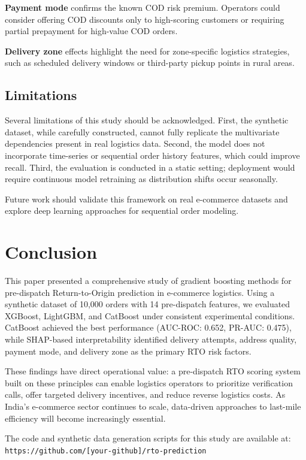 \documentclass[conference]{IEEEtran}
\begin{document}
\textbf{Payment mode} confirms the known COD risk premium. Operators could consider offering COD discounts only to high-scoring customers or requiring partial prepayment for high-value COD orders.

\textbf{Delivery zone} effects highlight the need for zone-specific logistics strategies, such as scheduled delivery windows or third-party pickup points in rural areas.

\subsection{Limitations}

Several limitations of this study should be acknowledged. First, the synthetic dataset, while carefully constructed, cannot fully replicate the multivariate dependencies present in real logistics data. Second, the model does not incorporate time-series or sequential order history features, which could improve recall. Third, the evaluation is conducted in a static setting; deployment would require continuous model retraining as distribution shifts occur seasonally.

Future work should validate this framework on real e-commerce datasets and explore deep learning approaches \cite{vaswani2017} for sequential order modeling.

\section{Conclusion}
\label{sec:conclusion}

This paper presented a comprehensive study of gradient boosting methods for pre-dispatch Return-to-Origin prediction in e-commerce logistics. Using a synthetic dataset of 10,000 orders with 14 pre-dispatch features, we evaluated XGBoost, LightGBM, and CatBoost under consistent experimental conditions. CatBoost achieved the best performance (AUC-ROC: 0.652, PR-AUC: 0.475), while SHAP-based interpretability identified delivery attempts, address quality, payment mode, and delivery zone as the primary RTO risk factors.

These findings have direct operational value: a pre-dispatch RTO scoring system built on these principles can enable logistics operators to prioritize verification calls, offer targeted delivery incentives, and reduce reverse logistics costs. As India's e-commerce sector continues to scale, data-driven approaches to last-mile efficiency will become increasingly essential.

The code and synthetic data generation scripts for this study are available at: \texttt{https://github.com/[your-github]/rto-prediction}



\end{document}
